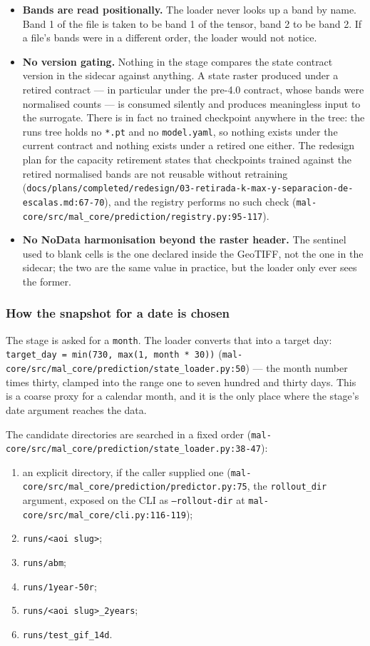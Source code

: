 \documentclass[11pt,a4paper]{article}
\newcommand{\code}[1]{\texttt{#1}}
\begin{document}
\begin{itemize}
\item \textbf{Bands are read positionally.} The loader never looks up a band
by name. Band 1 of the file is taken to be band 1 of the tensor, band 2 to be
band 2. If a file's bands were in a different order, the loader would not
notice.
\item \textbf{No version gating.} Nothing in the stage compares the state
contract version in the sidecar against anything. A state raster produced
under a retired contract --- in particular under the pre-4.0 contract, whose
bands were normalised counts --- is consumed silently and produces
meaningless input to the surrogate. There is in fact no trained checkpoint
anywhere in the tree: the runs tree holds no \code{*.pt} and no
\code{model.yaml}, so nothing exists under the current contract and nothing
exists under a retired one either. The
redesign plan for the capacity retirement states that checkpoints trained
against the retired normalised bands are not reusable without retraining
(\code{docs/plans/completed/redesign/03-retirada-k-max-y-separacion-de-escalas.md:67-70}),
and the registry performs no such check
(\code{mal-core/src/mal\_core/prediction/registry.py:95-117}).
\item \textbf{No NoData harmonisation beyond the raster header.} The
sentinel used to blank cells is the one declared inside the GeoTIFF, not the
one in the sidecar; the two are the same value in practice, but the loader
only ever sees the former.
\end{itemize}

\subsubsection{How the snapshot for a date is chosen}

The stage is asked for a \code{month}. The loader converts that into a target
day: \code{target\_day = min(730, max(1, month * 30))}
(\code{mal-core/src/mal\_core/prediction/state\_loader.py:50}) --- the month
number times thirty, clamped into the range one to seven hundred and thirty
days. This is a coarse proxy for a calendar month, and it is the only place
where the stage's date argument reaches the data.

The candidate directories are searched in a fixed order
(\code{mal-core/src/mal\_core/prediction/state\_loader.py:38-47}):

\begin{enumerate}
\item an explicit directory, if the caller supplied one
  (\code{mal-core/src/mal\_core/prediction/predictor.py:75}, the
  \code{rollout\_dir} argument, exposed on the CLI as
  \code{--rollout-dir} at \code{mal-core/src/mal\_core/cli.py:116-119});
\item \code{runs/<aoi slug>};
\item \code{runs/abm};
\item \code{runs/1year-50r};
\item \code{runs/<aoi slug>\_2years};
\item \code{runs/test\_gif\_14d}.
\end{enumerate}
\end{document}
